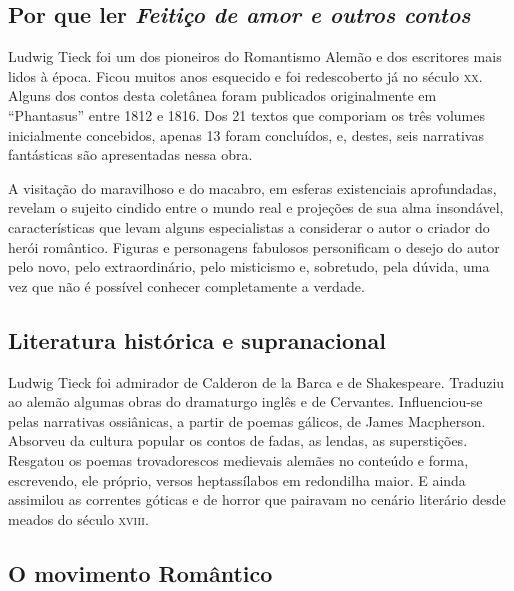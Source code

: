 \documentclass[12pt]{extarticle}
\begin{document}
\subsection{Por que ler \emph{Feitiço de amor e outros contos}}

Ludwig Tieck foi um dos pioneiros do Romantismo Alemão e dos escritores
mais lidos à época. Ficou muitos anos esquecido e foi redescoberto já no
século \textsc{xx}. Alguns dos contos desta coletânea foram publicados
originalmente em ``Phantasus'' entre 1812 e 1816. Dos 21 textos que
comporiam os três volumes inicialmente concebidos, apenas 13 foram
concluídos, e, destes, seis narrativas fantásticas são apresentadas
nessa obra.

A visitação do maravilhoso e do macabro, em esferas existenciais
aprofundadas, revelam o sujeito cindido entre o mundo real e projeções
de sua alma insondável, características que levam alguns especialistas a
considerar o autor o criador do herói romântico. Figuras e personagens
fabulosos personificam o desejo do autor pelo novo, pelo extraordinário,
pelo misticismo e, sobretudo, pela dúvida, uma vez que não é possível
conhecer completamente a verdade.


\subsection{Literatura histórica e supranacional}

Ludwig Tieck foi admirador de Calderon de la Barca e de Shakespeare.
Traduziu ao alemão algumas obras do dramaturgo inglês e de Cervantes.
Influenciou-se pelas narrativas ossiânicas, a partir de poemas gálicos,
de James Macpherson. Absorveu da cultura popular os contos de fadas, as
lendas, as superstições. Resgatou os poemas trovadorescos medievais
alemães no conteúdo e forma, escrevendo, ele próprio, versos
heptassílabos em redondilha maior. E ainda assimilou as correntes
góticas e de horror que pairavam no cenário literário desde meados do
século \textsc{xviii}.

\subsection{O movimento Romântico}
\end{document}
